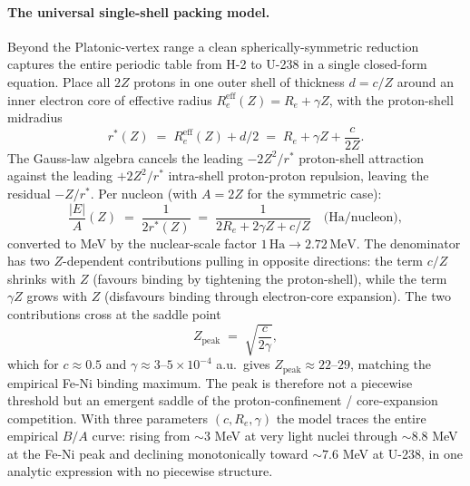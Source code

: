 \documentclass[11pt]{article}
\begin{document}
\paragraph{The universal single-shell packing model.}
Beyond the Platonic-vertex range a clean spherically-symmetric reduction captures the entire periodic table from H-2 to U-238 in a single closed-form equation. Place all $2Z$ protons in one outer shell of thickness $d = c/Z$ around an inner electron core of effective radius $R_e^\text{eff}(Z) = R_e + \gamma Z$, with the proton-shell midradius
\begin{equation}
r^*(Z) \;=\; R_e^\text{eff}(Z) + d/2 \;=\; R_e + \gamma Z + \frac{c}{2 Z}.
\end{equation}
The Gauss-law algebra cancels the leading $-2Z^2/r^*$ proton-shell attraction against the leading $+2Z^2/r^*$ intra-shell proton-proton repulsion, leaving the residual $-Z/r^*$. Per nucleon (with $A = 2Z$ for the symmetric case):
\begin{equation}
\boxed{\;\;\frac{|E|}{A}(Z) \;=\; \frac{1}{2 r^*(Z)} \;=\; \frac{1}{2 R_e + 2 \gamma Z + c/Z} \quad \text{(Ha/nucleon)},\;\;}
\end{equation}
converted to MeV by the nuclear-scale factor $1\,\mathrm{Ha} \to 2.72\,\mathrm{MeV}$. The denominator has two $Z$-dependent contributions pulling in opposite directions: the term $c/Z$ shrinks with $Z$ (favours binding by tightening the proton-shell), while the term $\gamma Z$ grows with $Z$ (disfavours binding through electron-core expansion). The two contributions cross at the saddle point
\begin{equation}
Z_\text{peak} \;=\; \sqrt{\frac{c}{2 \gamma}},
\end{equation}
which for $c \approx 0.5$ and $\gamma \approx 3$--$5 \times 10^{-4}$ a.u.\ gives $Z_\text{peak} \approx 22$--$29$, matching the empirical Fe-Ni binding maximum. The peak is therefore not a piecewise threshold but an emergent saddle of the proton-confinement / core-expansion competition. With three parameters $(c, R_e, \gamma)$ the model traces the entire empirical $B/A$ curve: rising from $\sim 3$ MeV at very light nuclei through $\sim 8.8$ MeV at the Fe-Ni peak and declining monotonically toward $\sim 7.6$ MeV at U-238, in one analytic expression with no piecewise structure.
\end{document}
